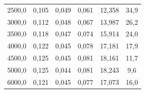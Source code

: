 \documentclass[a4paper, czech]{article}
\begin{document}
\begin{table}[H]
\begin{tabular}{cccccc}
        2500,0     & 0,105                                                                       & 0,049                                                                       & 0,061                                                                 & 12,358                                                         & 34,9                                                          \\
        3000,0     & 0,112                                                                       & 0,048                                                                       & 0,067                                                                 & 13,987                                                         & 26,2                                                          \\
        3500,0     & 0,118                                                                       & 0,047                                                                       & 0,074                                                                 & 15,914                                                         & 24,0                                                          \\
        4000,0     & 0,122                                                                       & 0,045                                                                       & 0,078                                                                 & 17,181                                                         & 17,9                                                          \\
        4500,0     & 0,125                                                                       & 0,045                                                                       & 0,081                                                                 & 18,161                                                         & 11,7                                                          \\
        5000,0     & 0,125                                                                       & 0,044                                                                       & 0,081                                                                 & 18,243                                                         & 9,6                                                           \\
        6000,0     & 0,121                                                                       & 0,045                                                                       & 0,077                                                                 & 17,073                                                         & 16,0                                                          \\

\end{tabular}
\end{table}
\end{document}
